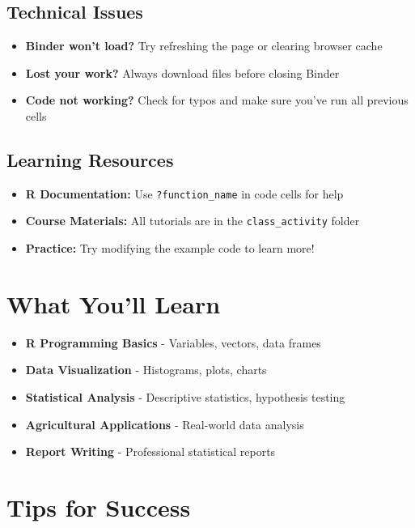 \documentclass[11pt,a4paper]{article}
\begin{document}
\subsection{Technical Issues}

\begin{itemize}
    \item \textbf{Binder won't load?} Try refreshing the page or clearing browser cache
    \item \textbf{Lost your work?} Always download files before closing Binder
    \item \textbf{Code not working?} Check for typos and make sure you've run all previous cells
\end{itemize}

\subsection{Learning Resources}

\begin{itemize}
    \item \textbf{R Documentation:} Use \texttt{?function\_name} in code cells for help
    \item \textbf{Course Materials:} All tutorials are in the \texttt{class\_activity} folder
    \item \textbf{Practice:} Try modifying the example code to learn more!
\end{itemize}

\section{What You'll Learn}

\begin{itemize}
    \item \textbf{R Programming Basics} - Variables, vectors, data frames
    \item \textbf{Data Visualization} - Histograms, plots, charts
    \item \textbf{Statistical Analysis} - Descriptive statistics, hypothesis testing
    \item \textbf{Agricultural Applications} - Real-world data analysis
    \item \textbf{Report Writing} - Professional statistical reports
\end{itemize}

\section{Tips for Success}
\end{document}
